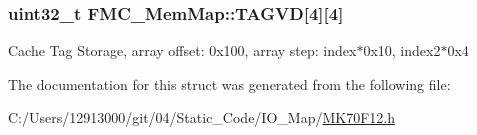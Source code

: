 \subsubsection[{T\+A\+G\+V\+D}]{\setlength{\rightskip}{0pt plus 5cm}uint32\+\_\+t F\+M\+C\+\_\+\+Mem\+Map\+::\+T\+A\+G\+V\+D\mbox{[}4\mbox{]}\mbox{[}4\mbox{]}}\label{struct_f_m_c___mem_map_aceee42cbeff95639e3a10a33f88ecb02}
Cache Tag Storage, array offset\+: 0x100, array step\+: index$\ast$0x10, index2$\ast$0x4 

The documentation for this struct was generated from the following file\+:\begin{DoxyCompactItemize}
\item 
C\+:/\+Users/12913000/git/04/\+Static\+\_\+\+Code/\+I\+O\+\_\+\+Map/\hyperlink{_m_k70_f12_8h}{M\+K70\+F12.\+h}\end{DoxyCompactItemize}
